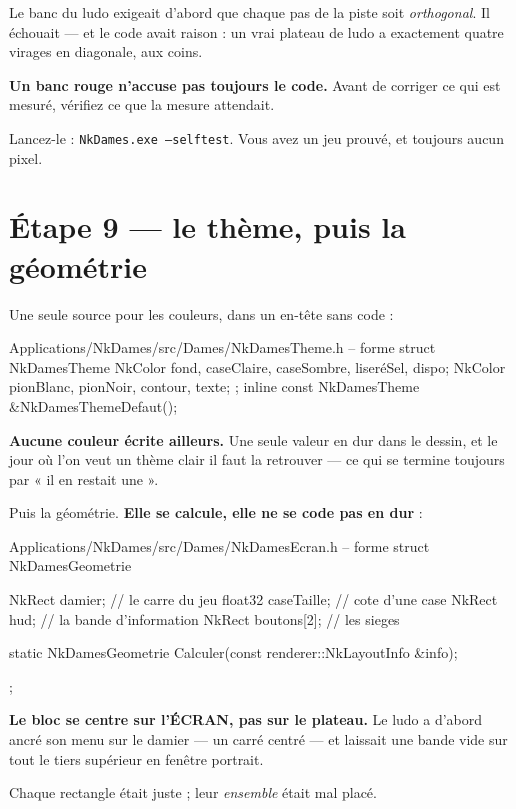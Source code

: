 \begin{nkpiege}
Le banc du ludo exigeait d'abord que chaque pas de la piste soit
\emph{orthogonal}. Il échouait --- et le code avait raison : un vrai plateau de
ludo a exactement quatre virages en diagonale, aux coins.

\textbf{Un banc rouge n'accuse pas toujours le code.} Avant de corriger ce qui
est mesuré, vérifiez ce que la mesure attendait.
\end{nkpiege}

\noindent Lancez-le : \texttt{NkDames.exe --selftest}. Vous avez un jeu prouvé,
et toujours aucun pixel.

\section{Étape 9 --- le thème, puis la géométrie}

Une seule source pour les couleurs, dans un en-tête sans code :

\begin{nkcode}{Applications/NkDames/src/Dames/NkDamesTheme.h -- forme}
struct NkDamesTheme {
        NkColor fond, caseClaire, caseSombre, liseréSel, dispo;
        NkColor pionBlanc, pionNoir, contour, texte;
};
inline const NkDamesTheme &NkDamesThemeDefaut();
\end{nkcode}

\begin{nkretenir}
\textbf{Aucune couleur écrite ailleurs.} Une seule valeur en dur dans le dessin,
et le jour où l'on veut un thème clair il faut la retrouver --- ce qui se
termine toujours par « il en restait une ».
\end{nkretenir}

Puis la géométrie. \textbf{Elle se calcule, elle ne se code pas en dur} :

\begin{nkcode}{Applications/NkDames/src/Dames/NkDamesEcran.h -- forme}
struct NkDamesGeometrie {
        NkRect damier;      // le carre du jeu
        float32 caseTaille; // cote d'une case
        NkRect hud;         // la bande d'information
        NkRect boutons[2];  // les sieges

        static NkDamesGeometrie Calculer(const renderer::NkLayoutInfo &info);
};
\end{nkcode}

\begin{nkpiege}
\textbf{Le bloc se centre sur l'ÉCRAN, pas sur le plateau.} Le ludo a d'abord
ancré son menu sur le damier --- un carré centré --- et laissait une bande vide
sur tout le tiers supérieur en fenêtre portrait.

Chaque rectangle était juste ; leur \emph{ensemble} était mal placé.
\end{nkpiege}

